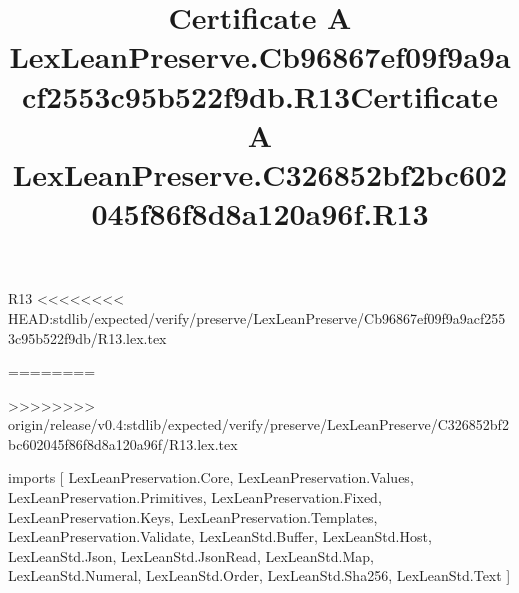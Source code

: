 \begin{lexlean}{R13}
<<<<<<<< HEAD:stdlib/expected/verify/preserve/LexLeanPreserve/Cb96867ef09f9a9acf2553c95b522f9db/R13.lex.tex
\title{Certificate A LexLeanPreserve.Cb96867ef09f9a9acf2553c95b522f9db.R13}
========
\title{Certificate A LexLeanPreserve.C326852bf2bc602045f86f8d8a120a96f.R13}
>>>>>>>> origin/release/v0.4:stdlib/expected/verify/preserve/LexLeanPreserve/C326852bf2bc602045f86f8d8a120a96f/R13.lex.tex
\begin{coremodule}
imports [
  LexLeanPreservation.Core,
  LexLeanPreservation.Values,
  LexLeanPreservation.Primitives,
  LexLeanPreservation.Fixed,
  LexLeanPreservation.Keys,
  LexLeanPreservation.Templates,
  LexLeanPreservation.Validate,
  LexLeanStd.Buffer,
  LexLeanStd.Host,
  LexLeanStd.Json,
  LexLeanStd.JsonRead,
  LexLeanStd.Map,
  LexLeanStd.Numeral,
  LexLeanStd.Order,
  LexLeanStd.Sha256,
  LexLeanStd.Text
]


\end{coremodule}
\end{lexlean}
